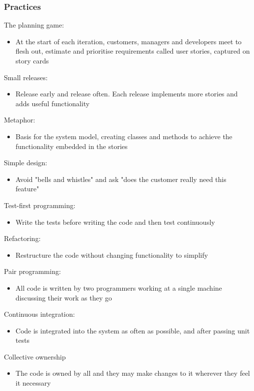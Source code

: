 \documentclass{article}[18pt]
\begin{document}
\subsubsection{Practices}
The planning game:
\begin{itemize}
	\item At the start of each iteration, customers, managers and developers meet to flesh out, estimate and prioritise requirements called user stories, captured on story cards
\end{itemize}
Small releases:
\begin{itemize}
	\item Release early and release often. Each release implements more stories and adds useful functionality
\end{itemize}
Metaphor:
\begin{itemize}
	\item Basis for the system model, creating classes and methods to achieve the functionality embedded in the stories
\end{itemize}
Simple design:
\begin{itemize}
	\item Avoid "bells and whistles" and ask "does the customer really need this feature"
\end{itemize}
Test-first programming:
\begin{itemize}
	\item Write the tests before writing the code and then test continuously
\end{itemize}
Refactoring:
\begin{itemize}
	\item Restructure the code without changing functionality to simplify
\end{itemize}
Pair programming:
\begin{itemize}
	\item All code is written by two programmers working at a single machine discussing their work as they go
\end{itemize}
Continuous integration:
\begin{itemize}
	\item Code is integrated into the system as often as possible, and after passing unit tests
\end{itemize}
Collective ownership
\begin{itemize}
	\item The code is owned by all and they may make changes to it wherever they feel it necessary
\end{itemize}
\end{document}
